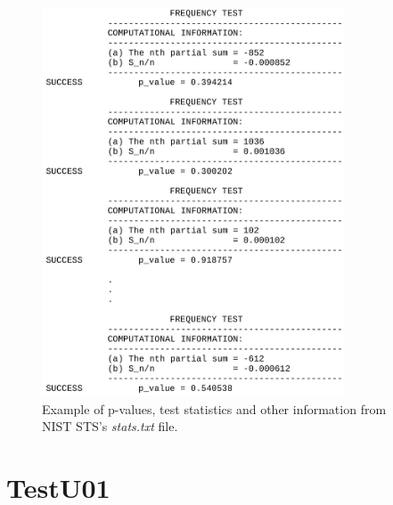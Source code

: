 \documentclass[
  digital,     %
  oneside,     %
  nosansbold,  %
  nocolorbold, %
  nolof,         %
  nolot,         %
]{fithesis4}
\begin{document}
\newpage

\begin{figure}[h]
  \begin{center}
    \includegraphics[width=9cm]{figures/outputs-appendix/stats.jpg}
  \end{center}
  \caption{Example of p-values, test statistics and other information from NIST STS's \emph{stats.txt} file.}
  \label{fig:nist_stats}
\end{figure}

\newpage

\section{TestU01} \label{append:tu01-output}
\end{document}
